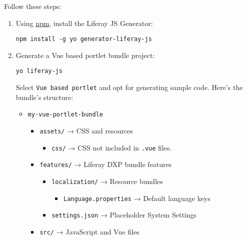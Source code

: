 \noindent\hrulefill

Follow these steps:

\begin{enumerate}
\def\labelenumi{\arabic{enumi}.}
\item
  Using \href{https://www.npmjs.com/}{npm}, install the Liferay JS
  Generator:

\begin{verbatim}
npm install -g yo generator-liferay-js
\end{verbatim}
\item
  Generate a Vue based portlet bundle project:

\begin{verbatim}
yo liferay-js
\end{verbatim}

  Select \texttt{Vue\ based\ portlet} and opt for generating sample
  code. Here's the bundle's structure:

  \begin{itemize}
  \tightlist
  \item
    \texttt{my-vue-portlet-bundle}

    \begin{itemize}
    \tightlist
    \item
      \texttt{assets/} → CSS and resources

      \begin{itemize}
      \tightlist
      \item
        \texttt{css/} → CSS not included in \texttt{.vue} files.
      \end{itemize}
    \item
      \texttt{features/} → Liferay DXP bundle features

      \begin{itemize}
      \tightlist
      \item
        \texttt{localization/} → Resource bundles

        \begin{itemize}
        \tightlist
        \item
          \texttt{Language.properties} → Default language keys
        \end{itemize}
      \item
        \texttt{settings.json} → Placeholder System Settings
      \end{itemize}
    \item
      \texttt{src/} → JavaScript and Vue files


\end{itemize}
\end{itemize}
\end{enumerate}

